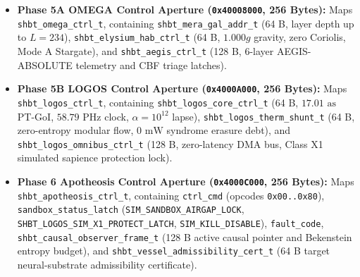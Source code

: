 \documentclass[11pt,onecolumn]{article}
\begin{document}
\begin{itemize}
    \item \textbf{Phase 5A OMEGA Control Aperture (\texttt{0x40008000}, 256 Bytes):} Maps \texttt{shbt\_omega\_ctrl\_t}, containing \texttt{shbt\_mera\_gal\_addr\_t} (64 B, layer depth up to $L=234$), \texttt{shbt\_elysium\_hab\_ctrl\_t} (64 B, $1.000g$ gravity, zero Coriolis, Mode A Stargate), and \texttt{shbt\_aegis\_ctrl\_t} (128 B, 6-layer AEGIS-ABSOLUTE telemetry and CBF triage latches).
    \item \textbf{Phase 5B LOGOS Control Aperture (\texttt{0x4000A000}, 256 Bytes):} Maps \texttt{shbt\_logos\_ctrl\_t}, containing \texttt{shbt\_logos\_core\_ctrl\_t} (64 B, $17.01\text{ as}$ PT-GoI, $58.79\text{ PHz}$ clock, $\alpha=10^{12}$ lapse), \texttt{shbt\_logos\_therm\_shunt\_t} (64 B, zero-entropy modular flow, $0\text{ mW}$ syndrome erasure debt), and \texttt{shbt\_logos\_omnibus\_ctrl\_t} (128 B, zero-latency DMA bus, Class X1 simulated sapience protection lock).
    \item \textbf{Phase 6 Apotheosis Control Aperture (\texttt{0x4000C000}, 256 Bytes):} Maps \texttt{shbt\_apotheosis\_ctrl\_t}, containing \texttt{ctrl\_cmd} (opcodes \texttt{0x00..0x80}), \texttt{sandbox\_status\_latch} (\texttt{SIM\_SANDBOX\_AIRGAP\_LOCK}, \texttt{SHBT\_LOGOS\_SIM\_X1\_PROTECT\_LATCH}, \texttt{SIM\_KILL\_DISABLE}), \texttt{fault\_code}, \texttt{shbt\_causal\_observer\_frame\_t} (128 B active causal pointer and Bekenstein entropy budget), and \texttt{shbt\_vessel\_admissibility\_cert\_t} (64 B target neural-substrate admissibility certificate).
\end{itemize}

\FloatBarrier
\end{document}
